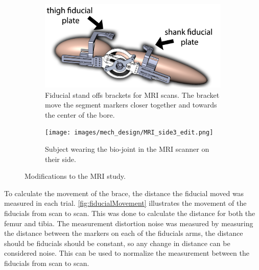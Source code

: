 \begin{figure}[ht!]
    \begin{subfigure}{\textwidth}
        \centering
        \includegraphics[width=0.75\linewidth]{images/mech_design/mri_knee_with_markers_edit.png}
          \captionsetup{justification=centering}
        \caption[fiducial stand off]{Fiducial stand offs brackets for MRI scans. The bracket move the segment markers closer together and towards the center of the bore.}
        \label{fig:MRIMarkerStandoff}
    \end{subfigure}
    \begin{subfigure}{\textwidth}
        \centering
        \texttt{[image: images/mech\_design/MRI\_side3\_edit.png]}
          \captionsetup{justification=centering}
        \caption[MRI Subject on Side]{Subject wearing the bio-joint in the MRI scanner on their side.}
        \label{fig:wearingMRIBIOJointSide}
    \end{subfigure}
    \caption[MRI scan Fixes]{Modifications to the MRI study.}
    \label{fig:MRIFixes}
\end{figure}

To calculate the movement of the brace, the distance the fiducial moved was measured in each trial. \autoref{fig:fiducialMovement} illustrates the movement of the fiducials from scan to scan. This was done to calculate the distance for both the femur and tibia. The measurement distortion noise was measured by measuring the distance between the markers on each of the fiducials arms, the distance should be fiducials should be constant, so any change in distance can be considered noise. This can be used to normalize the measurement between the fiducials from scan to scan. 


